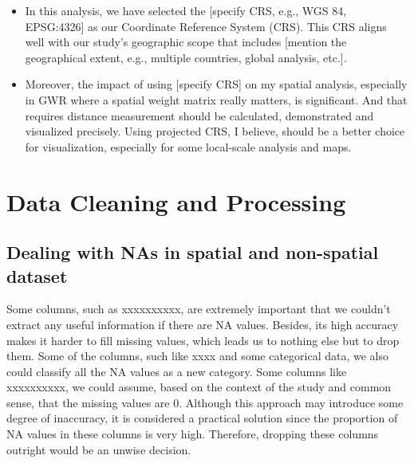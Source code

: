 \documentclass[
]{article}
\begin{document}
\begin{itemize}
\item
  In this analysis, we have selected the {[}specify CRS, e.g., WGS 84,
  EPSG:4326{]} as our Coordinate Reference System (CRS). This CRS aligns
  well with our study's geographic scope that includes {[}mention the
  geographical extent, e.g., multiple countries, global analysis,
  etc.{]}.
\item
  Moreover, the impact of using {[}specify CRS{]} on my spatial
  analysis, especially in GWR where a spatial weight matrix really
  matters, is significant. And that requires distance measurement should
  be calculated, demonstrated and visualized precisely. Using projected
  CRS, I believe, should be a better choice for visualization,
  especially for some local-scale analysis and maps.
\end{itemize}

\hypertarget{data-cleaning-and-processing}{%
\section{Data Cleaning and
Processing}\label{data-cleaning-and-processing}}

\hypertarget{dealing-with-nas-in-spatial-and-non-spatial-dataset}{%
\subsection{Dealing with NAs in spatial and non-spatial
dataset}\label{dealing-with-nas-in-spatial-and-non-spatial-dataset}}

Some columns, such as xxxxxxxxxx, are extremely important that we
couldn't extract any useful information if there are NA values. Besides,
its high accuracy makes it harder to fill missing values, which leads us
to nothing else but to drop them. Some of the columns, such like xxxx
and some categorical data, we also could classify all the NA values as a
new category. Some columns like xxxxxxxxxx, we could assume, based on
the context of the study and common sense, that the missing values are
0. Although this approach may introduce some degree of inaccuracy, it is
considered a practical solution since the proportion of NA values in
these columns is very high. Therefore, dropping these columns outright
would be an unwise decision.
\end{document}
